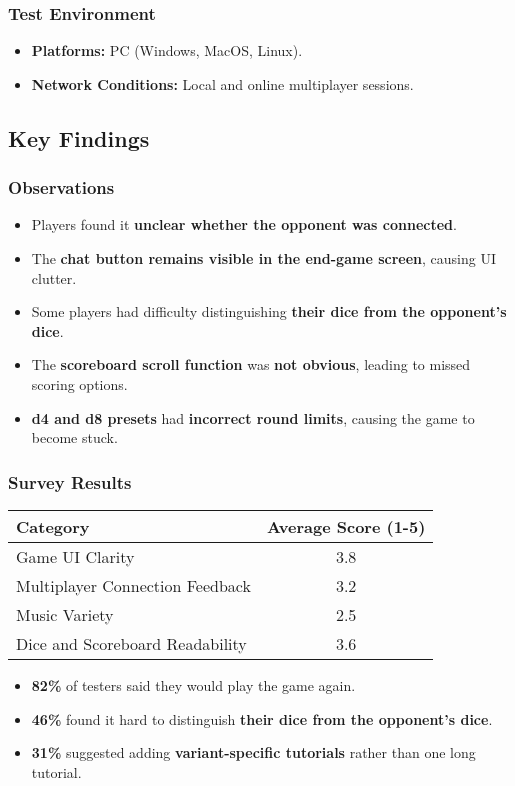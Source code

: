 \documentclass{article}
\begin{document}
\subsubsection{Test Environment}
\begin{itemize}
    \item \textbf{Platforms:} PC (Windows, MacOS, Linux).
    \item \textbf{Network Conditions:} Local and online multiplayer sessions.
\end{itemize}

\subsection{Key Findings}
\subsubsection{Observations}
\begin{itemize}
    \item Players found it \textbf{unclear whether the opponent was connected}.
    \item The \textbf{chat button remains visible in the end-game screen}, causing UI clutter.
    \item Some players had difficulty distinguishing \textbf{their dice from the opponent's dice}.
    \item The \textbf{scoreboard scroll function} was \textbf{not obvious}, leading to missed scoring options.
    \item \textbf{d4 and d8 presets} had \textbf{incorrect round limits}, causing the game to become stuck.
\end{itemize}

\subsubsection{Survey Results}
\begin{longtable}{|p{7cm}|c|}
\hline
\textbf{Category} & \textbf{Average Score (1-5)} \\
\hline
Game UI Clarity & 3.8 \\
\hline
Multiplayer Connection Feedback & 3.2 \\
\hline
Music Variety & 2.5 \\
\hline
Dice and Scoreboard Readability & 3.6 \\
\hline
\end{longtable}

\begin{itemize}
    \item \textbf{82\%} of testers said they would play the game again.
    \item \textbf{46\%} found it hard to distinguish \textbf{their dice from the opponent’s dice}.
    \item \textbf{31\%} suggested adding \textbf{variant-specific tutorials} rather than one long tutorial.
\end{itemize}
\end{document}
